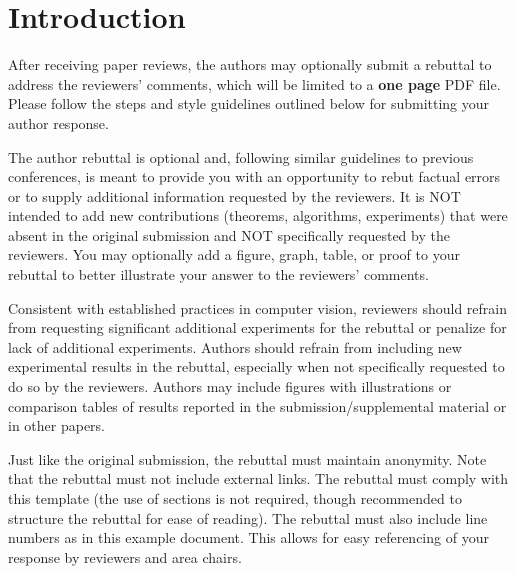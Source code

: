 \documentclass[10pt,twocolumn,letterpaper]{article}
\begin{document}

\maketitle
\thispagestyle{empty}
\appendix


\section{Introduction}

After receiving paper reviews, the authors may optionally submit a rebuttal to address the reviewers' comments, which will be limited to a {\bf one page} PDF file.
Please follow the steps and style guidelines outlined below for submitting your author response.

The author rebuttal is optional and, following similar guidelines to previous conferences, is meant to provide you with an opportunity to rebut factual errors or to supply additional information requested by the reviewers.
It is NOT intended to add new contributions (theorems, algorithms, experiments) that were absent in the original submission and NOT specifically requested by the reviewers.
You may optionally add a figure, graph, table, or proof to your rebuttal to better illustrate your answer to the reviewers' comments.

Consistent with established practices in computer vision, reviewers should refrain from requesting significant additional experiments for the rebuttal or penalize for lack of additional experiments.
Authors should refrain from including new experimental results in the rebuttal, especially when not specifically requested to do so by the reviewers.
Authors may include figures with illustrations or comparison tables of results reported in the submission/supplemental material or in other papers.

Just like the original submission, the rebuttal must maintain anonymity.
Note that the rebuttal must not include external links.
The rebuttal must comply with this template (the use of sections is not required, though recommended to structure the rebuttal for ease of reading).
The rebuttal must also include line numbers as in this example document.
This allows for easy referencing of your response by reviewers and area chairs.
\end{document}
